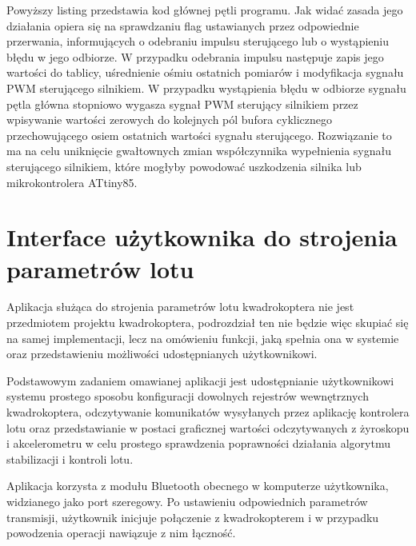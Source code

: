 Powyższy listing przedstawia kod głównej pętli programu. Jak widać zasada jego działania opiera się na sprawdzaniu flag ustawianych przez odpowiednie przerwania, informujących o odebraniu impulsu sterującego lub o wystąpieniu błędu w jego odbiorze. W przypadku odebrania impulsu następuje zapis jego wartości do tablicy, uśrednienie ośmiu ostatnich pomiarów i modyfikacja sygnału PWM sterującego silnikiem. W przypadku wystąpienia błędu w odbiorze sygnału pętla główna stopniowo wygasza sygnał PWM sterujący silnikiem przez wpisywanie wartości zerowych do kolejnych pól bufora cyklicznego przechowującego osiem ostatnich wartości sygnału sterującego. Rozwiązanie to ma na celu uniknięcie gwałtownych zmian współczynnika wypełnienia sygnału sterującego silnikiem, które mogłyby powodować uszkodzenia silnika lub mikrokontrolera ATtiny85.

\section{Interface użytkownika do strojenia parametrów lotu}

Aplikacja służąca do strojenia parametrów lotu kwadrokoptera nie jest przedmiotem projektu kwadrokoptera, podrozdział ten nie będzie więc skupiać się na samej implementacji, lecz na omówieniu funkcji, jaką spełnia ona w systemie oraz przedstawieniu możliwości udostępnianych użytkownikowi. 

Podstawowym zadaniem omawianej aplikacji jest udostępnianie użytkownikowi systemu prostego sposobu konfiguracji dowolnych rejestrów wewnętrznych kwadrokoptera, odczytywanie komunikatów wysyłanych przez aplikację kontrolera lotu oraz przedstawianie w postaci graficznej wartości odczytywanych z żyroskopu i akcelerometru w celu prostego sprawdzenia poprawności działania algorytmu stabilizacji i kontroli lotu.

Aplikacja korzysta z modułu Bluetooth obecnego w komputerze użytkownika, widzianego jako port szeregowy. Po ustawieniu odpowiednich parametrów transmisji, użytkownik inicjuje połączenie z kwadrokopterem i w przypadku powodzenia operacji nawiązuje z nim łączność. 

